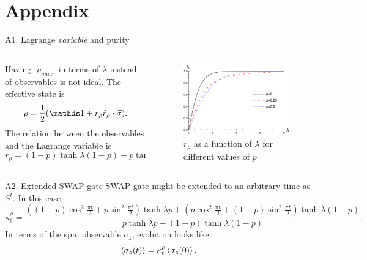 \section{Appendix}

\begin{frame}{A1. Lagrange \textit{variable} and purity}
    \begin{columns}
        \begin{column}{0.5\textwidth}
            Having $\varrho_{max}$ in terms of $\lambda$ instead of observables is not ideal. The effective state is
            \begin{equation*}
                \rho=\frac{1}{2}(\Id+r_{\rho}\hat{r}_{\rho}\cdot\vec{\sigma}).
            \end{equation*}
            The relation between the observables and the Lagrange variable is
            \begin{equation*}
                r_{\rho}=(1-p)\tanh{\lambda (1-p)}+p\tanh{\lambda p}.
            \end{equation*}
        \end{column}
        \begin{column}{0.5\textwidth}
            \begin{figure}[h!]
                \includegraphics[width=0.8\columnwidth]{figures/r(lambda).png}%
                \caption{$r_{\rho}$ as a function of $\lambda$ for different values of $p$}
            \end{figure}
        \end{column}
    \end{columns}
\end{frame}

\begin{frame}{A2. Extended SWAP gate}
    SWAP gate might be extended to an arbitrary time as $S^{t}$. In this case, 
    \begin{equation*}
        \kappa_{t}^{\rho}=\frac{((1-p)\cos^{2}{\frac{\pi t}{2}}+p\sin^{2}{\frac{\pi t}{2}})\tanh{\lambda p}+(p\cos^{2}{\frac{\pi t}{2}}+(1-p)\sin^{2}{\frac{\pi t}{2}})\tanh{\lambda (1-p)}}{
          p\tanh{\lambda p}+(1-p)\tanh{\lambda (1-p)}}.
      \end{equation*}
      In terms of the spin observable $\sigma_{z}$, evolution looks like
\begin{equation}
  \expval{\sigma_{z}(t)}=\kappa_{t}^{\rho}\expval{\sigma_{z}(0)}.
\end{equation}
\end{frame}

